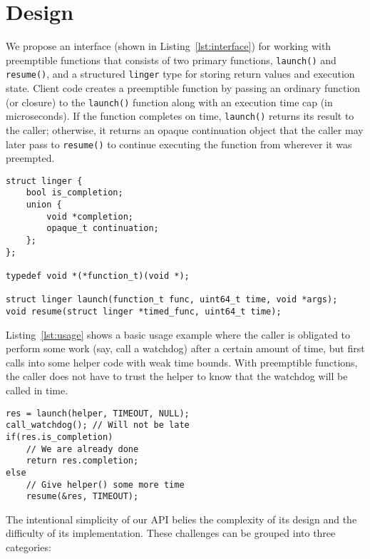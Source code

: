 \section{Design}

We propose an interface (shown in Listing~\ref{lst:interface}) for working with
preemptible functions that consists of two primary functions, \texttt{launch()} and
\texttt{resume()}, and a structured \texttt{linger} type for storing return values
and execution state.  Client code creates a preemptible function by passing an
ordinary function (or closure) to the \texttt{launch()} function along with an
execution time cap (in microseconds).  If the function completes on time,
\texttt{launch()} returns its result to the caller; otherwise, it returns an opaque
continuation object that the caller may later pass to \texttt{resume()} to continue
executing the function from wherever it was preempted.

\begin{lstlisting}[label=lst:interface,caption=Preemptible functions C-language interface]
struct linger {
	bool is_completion;
	union {
		void *completion;
		opaque_t continuation;
	};
};

typedef void *(*function_t)(void *);

struct linger launch(function_t func, uint64_t time, void *args);
void resume(struct linger *timed_func, uint64_t time);
\end{lstlisting}

Listing~\ref{lst:usage} shows a basic usage example where the caller is obligated to
perform some work (say, call a watchdog) after a certain amount of time, but first
calls into some helper code with weak time bounds.  With preemptible functions,
the caller does not have to trust the helper to know that the watchdog will be called
in time.

\begin{lstlisting}[label=lst:usage,caption=Preemptible function usage example]
res = launch(helper, TIMEOUT, NULL);
call_watchdog(); // Will not be late
if(res.is_completion)
	// We are already done
	return res.completion;
else
	// Give helper() some more time
	resume(&res, TIMEOUT);
\end{lstlisting}

The intentional simplicity of our API belies the complexity of its design and the
difficulty of its implementation.  These challenges can be grouped into three
categories:

